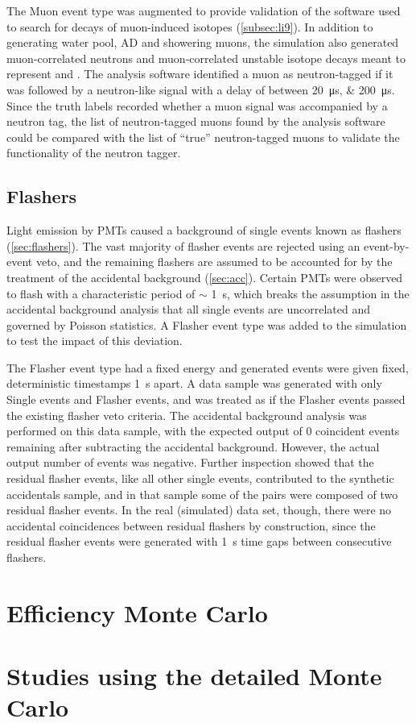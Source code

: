 The Muon event type was augmented to provide validation
of the software used to search for decays of muon-induced isotopes
(\cref{subsec:li9}).
In addition to generating water pool, AD and showering muons,
the simulation also generated muon-correlated neutrons
and muon-correlated unstable isotope decays
meant to represent \li{} and \he.
The analysis software identified a muon as neutron-tagged
if it was followed by a neutron-like signal
with a delay of between \SIlist{20;200}{\us}.
Since the truth labels recorded whether a muon signal
was accompanied by a neutron tag,
the list of neutron-tagged muons found by the analysis software
could be compared with the list of ``true'' neutron-tagged muons
to validate the functionality of the neutron tagger.

\subsection{Flashers}
\label{subsec:toymc_flashers}

Light emission by PMTs caused a background of single events
known as flashers (\cref{sec:flashers}).
The vast majority of flasher events are rejected using an event-by-event veto,
and the remaining flashers are assumed to be accounted for
by the treatment of the accidental background (\cref{sec:acc}).
Certain PMTs were observed to flash with a characteristic period of $\sim$ \SI{1}{\s},
which breaks the assumption in the accidental background analysis
that all single events are uncorrelated and governed by Poisson statistics.
A Flasher event type was added to the simulation to test the impact of this deviation.

The Flasher event type had a fixed energy
and generated events were given fixed, deterministic timestamps \SI{1}{\s} apart.
A data sample was generated with only Single events and Flasher events,
and was treated as if the Flasher events passed the existing flasher veto criteria.
The accidental background analysis was performed on this data sample,
with the expected output of \num{0} coincident events remaining
after subtracting the accidental background.
However, the actual output number of events was negative.
Further inspection showed that the residual flasher events,
like all other single events,
contributed to the synthetic accidentals sample,
and in that sample some of the pairs
were composed of two residual flasher events.
In the real (simulated) data set, though,
there were no accidental coincidences between residual flashers by construction,
since the residual flasher events were generated with \SI{1}{\s} time gaps
between consecutive flashers.

\section{Efficiency Monte Carlo}
\label{sec:thu_toymc}

\section{Studies using the detailed Monte Carlo}
\label{sec:thu_toymc_studies}
